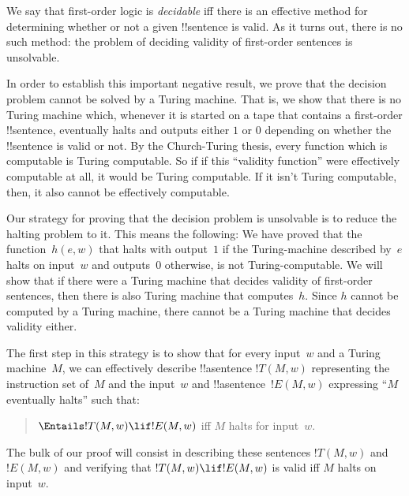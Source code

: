 \documentclass[../../../include/open-logic-section]{subfiles}
\begin{document}

We say that first-order logic is \emph{decidable} iff there is an
effective method for determining whether or not a given !!{sentence}
is valid. As it turns out, there is no such method: the problem of
deciding validity of first-order sentences is unsolvable.

In order to establish this important negative result, we prove that
the decision problem cannot be solved by a Turing machine.  That is,
we show that there is no Turing machine which, whenever it is started
on a tape that contains a first-order !!{sentence}, eventually halts
and outputs either $1$ or $0$ depending on whether the
!!{sentence} is valid or not. By the Church-Turing thesis, every
function which is computable is Turing computable. So if if this
``validity function'' were effectively computable at all, it would be
Turing computable. If it isn't Turing computable, then, it also cannot
be effectively computable.

Our strategy for proving that the decision problem is unsolvable is to
reduce the halting problem to it.  This means the following: We have
proved that the function~$h(e,w)$ that halts with output~$1$ if the
Turing-machine described by~$e$ halts on input~$w$ and outputs~$0$
otherwise, is not Turing-computable.  We will show that if there were
a Turing machine that decides validity of first-order sentences, then
there is also Turing machine that computes~$h$.  Since $h$ cannot be
computed by a Turing machine, there cannot be a Turing machine that
decides validity either.

The first step in this strategy is to show that for every input~$w$
and a Turing machine~$M$, we can effectively describe !!a{sentence}
$!T(M, w)$ representing the instruction set of~$M$ and the input~$w$
and !!a{sentence}~$!E(M, w)$ expressing ``$M$ eventually halts'' such
that:
\begin{quote}
  $\Entails !T(M, w) \lif !E(M,w)$ iff $M$ halts for input~$w$.
\end{quote}
The bulk of our proof will consist in describing these sentences
$!T(M, w)$ and $!E(M, w)$ and verifying that $!T(M, w) \lif !E(M, w)$
is valid iff $M$ halts on input~$w$.
\end{document}
